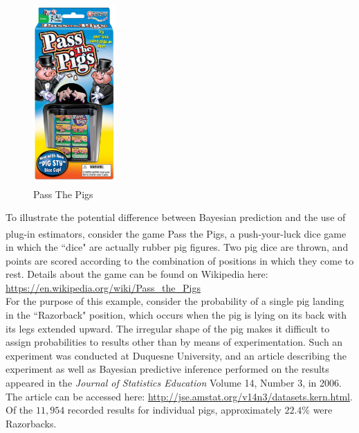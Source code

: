 \documentclass[12pt, a4paper]{article}
\begin{document}
\setlength{\intextsep}{20pt}
\begin{figure}
  \centering
    \includegraphics[width=0.28\textwidth]{./Graphics/PassThePigs/PtPBox}
  \caption{Pass The Pigs\textsuperscript{\circledR}}
\end{figure}

\noindent To illustrate the potential difference between Bayesian prediction and the use of plug-in estimators, consider the game Pass the Pigs\textsuperscript{\circledR}, a push-your-luck dice game in which the ``dice" are actually rubber pig figures.  Two pig dice are thrown, and points are scored according to the combination of positions in which they come to rest.  Details about the game can be found on Wikipedia here: \url{https://en.wikipedia.org/wiki/Pass_the_Pigs}\\

\noindent For the purpose of this example, consider the probability of a single pig landing in the ``Razorback" position, which occurs when the pig is lying on its back with its legs extended upward.  The irregular shape of the pig makes it difficult to assign probabilities to results other than by means of experimentation.  Such an experiment was conducted at Duquesne University, and an article describing the experiment as well as Bayesian predictive inference performed on the results appeared in the \textit{Journal of Statistics Education} Volume 14, Number 3, in 2006.  The article can be accessed here:  \url{http://jse.amstat.org/v14n3/datasets.kern.html}. Of the $11,954$ recorded results for individual pigs, approximately $22.4\%$ were Razorbacks.\\
\end{document}
